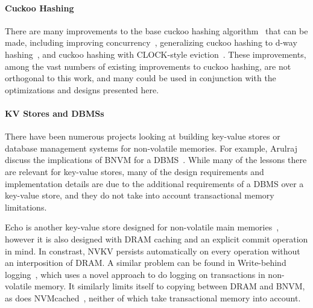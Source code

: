 \paragraph{Cuckoo Hashing}

There are many improvements to the base cuckoo hashing
algorithm~\cite{Pagh:2004} that can be made, including improving
concurrency~\cite{Li:2014ch}, generalizing cuckoo hashing to d-way
hashing~\cite{Fotakis:hashing}, and cuckoo hashing with CLOCK-style
eviction~\cite{Fan:2013}. These improvements, among the vast numbers of existing
improvements to cuckoo hashing, are not orthogonal to this work, and many could
be used in conjunction with the optimizations and designs presented here.

\paragraph{KV Stores and DBMSs}

There have been numerous projects looking at building key-value stores or
database management systems for non-volatile memories. For example, Arulraj
\etal discuss the implications of BNVM for a DBMS~\cite{Arulraj:2017}. While
many of the lessons there are relevant for key-value stores, many of the design
requirements and implementation details are due to the additional requirements
of a DBMS over a key-value store, and they do not take into account
transactional memory limitations.


Echo is another key-value store designed for non-volatile main
memories~\cite{echo}, however it is also designed with DRAM caching and an
explicit commit operation in mind. In constrast, NVKV persists automatically on
every operation without an interposition of DRAM. A similar problem can be
found in Write-behind logging~\cite{Arulraj:2016wbl}, which uses a novel approach to do logging on
transactions in non-volatile memory. It similarly limits itself to copying
between DRAM and BNVM, as does NVMcached~\cite{Wu:2016}, neither of which
take transactional memory into account.

